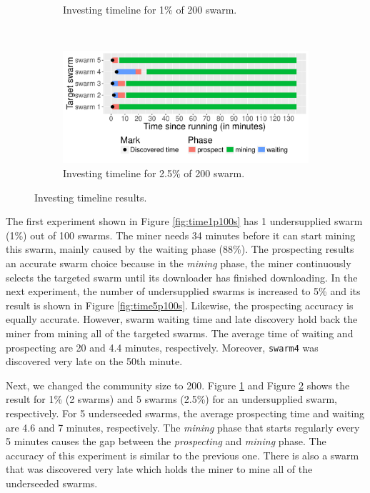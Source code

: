 \begin{figure}[th]
\begin{adjustwidth}{-1.5cm}{}
\begin{subfigure}[t]{0.6\textwidth}
		\caption{Investing timeline for 1\% of 200 swarm.}
		\label{fig:time1p200s}
	\end{subfigure}
	~
	\begin{subfigure}[t]{0.6\textwidth}
		\centering
		\includegraphics[width=\textwidth]{pics/results/time-25p200s.pdf}
		\caption{Investing timeline for 2.5\% of 200 swarm.}
		\label{fig:time2p200s}
	\end{subfigure}
	\caption{Investing timeline results.}
	\label{fig:timeprosexp}
\end{adjustwidth}
\end{figure}

The first experiment shown in Figure \ref{fig:time1p100s} has 1 undersupplied swarm (1\%) out of 100 swarms. The miner needs 34 minutes before it can start mining this swarm, mainly caused by the waiting phase (88\%). The prospecting results an accurate swarm choice because in the \textit{mining} phase, the miner continuously selects the targeted swarm until its downloader has finished downloading. In the next experiment, the number of undersupplied swarms is increased to 5\% and its result is shown in Figure \ref{fig:time5p100s}. Likewise, the prospecting accuracy is equally accurate. However, swarm waiting time and late discovery hold back the miner from mining all of the targeted swarms. The average time of waiting and prospecting are 20 and 4.4 minutes, respectively. Moreover, \texttt{swarm4} was discovered very late on the 50th minute.

Next, we changed the community size to 200. Figure \ref{fig:time1p200s} and Figure \ref{fig:time2p200s} shows the result for 1\% (2 swarms) and 5 swarms (2.5\%) for an undersupplied swarm, respectively. For 5 underseeded swarms, the average prospecting time and waiting are 4.6 and 7 minutes, respectively. The \textit{mining} phase that starts regularly every 5 minutes causes the gap between the \textit{prospecting} and \textit{mining} phase. The accuracy of this experiment is similar to the previous one. There is also a swarm that was discovered very late which holds the miner to mine all of the underseeded swarms.


